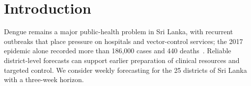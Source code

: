%
%
%
%
%
%
%
\section{Introduction}
\label{sec:intro}

Dengue remains a major public-health problem in Sri Lanka, with recurrent outbreaks that place pressure on hospitals and vector-control services; the 2017 epidemic alone recorded more than 186{,}000 cases and 440 deaths~\cite{tissera2020severe}. Reliable district-level forecasts can support earlier preparation of clinical resources and targeted control. We consider weekly forecasting for the 25 districts of Sri Lanka with a three-week horizon.


